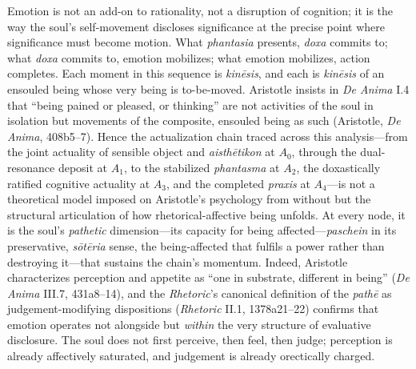 Emotion is not an add-on to rationality, not a disruption of cognition; it is the way the soul's self-movement discloses significance at the precise point where significance must become motion. What \textit{phantasia} presents, \textit{doxa} commits to; what \textit{doxa} commits to, emotion mobilizes; what emotion mobilizes, action completes. Each moment in this sequence is \textit{kinēsis}, and each is \textit{kinēsis} of an ensouled being whose very being is to-be-moved. Aristotle insists in \textit{De Anima} I.4 that ``being pained or pleased, or thinking'' are not activities of the soul in isolation but movements of the composite, ensouled being as such (Aristotle, \textit{De Anima}, 408b5--7). Hence the actualization chain traced across this analysis---from the joint actuality of sensible object and \textit{aisthētikon} at $A_0$, through the dual-resonance deposit at $A_1$, to the stabilized \textit{phantasma} at $A_2$, the doxastically ratified cognitive actuality at $A_3$, and the completed \textit{praxis} at $A_4$---is not a theoretical model imposed on Aristotle's psychology from without but the structural articulation of how rhetorical-affective being unfolds. At every node, it is the soul's \textit{pathetic} dimension---its capacity for being affected---\textit{paschein} in its preservative, \textit{sōtēria} sense, the being-affected that fulfils a power rather than destroying it---that sustains the chain's momentum. Indeed, Aristotle characterizes perception and appetite as ``one in substrate, different in being'' (\textit{De Anima} III.7, 431a8--14), and the \textit{Rhetoric}'s canonical definition of the \textit{pathē} as judgement-modifying dispositions (\textit{Rhetoric} II.1, 1378a21--22) confirms that emotion operates not alongside but \textit{within} the very structure of evaluative disclosure. The soul does not first perceive, then feel, then judge; perception is already affectively saturated, and judgement is already orectically charged.


